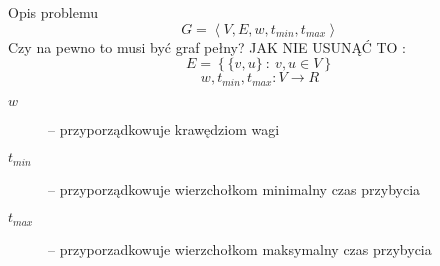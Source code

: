 \begin{block}{Opis problemu}
	\begin{equation}
		G = \left< V, E, w, t_{min}, t_{max} \right>
	\end{equation}
	Czy na pewno to musi być graf pełny? JAK NIE USUNĄĆ TO :
	\begin{equation}
		E = \left\{ \{v, u\} \ : \ v, u \in V \right\}
	\end{equation}
	\begin{equation}
		w, t_{min}, t_{max} : V \rightarrow R
	\end{equation}
	\begin{description}
		\item[$w$] -- przyporządkowuje krawędziom wagi
		\item[$t_{min}$] -- przyporządkowuje wierzchołkom minimalny czas przybycia
		\item[$t_{max}$] -- przyporzadkowuje wierzchołkom maksymalny czas przybycia
	\end{description}
\end{block}
